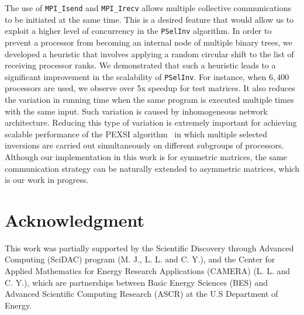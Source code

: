 \documentclass{acm_proc_article-sp}
\newcommand{\pselinv}{\texttt{PSelInv}\xspace}
\begin{document}
The use of \texttt{MPI\_Isend} and \texttt{MPI\_Irecv} 
allows multiple collective communications to be initiated
at the same time. This is a desired feature that would allow
us to exploit a higher level of concurrency in the \pselinv 
algorithm. In order to prevent a processor from becoming 
an internal node of multiple binary trees, we developed
a heuristic that involves applying a random circular shift to 
the list of receiving processor ranks. We demonstrated that such
a heuristic leads to a significant improvement in the scalability
of \pselinv. For instance, when $6,400$ processors are used, we observe
over 5x speedup for test matrices. It also reduces the variation in running time when
the same program is executed multiple times with the same input.
Such variation is caused by inhomogeneous network architecture.
Reducing this type of variation is extremely important for 
achieving scalable performance of the PEXSI
algorithm~\cite{LinLuYingCarE2009,LinYangLuEtAl2011,LinChenYangEtAl2013}
in which multiple selected inversions are carried out simultaneously on
different subgroups of processors. Although our implementation in this
work is for symmetric matrices, the same communication strategy can
be naturally extended to asymmetric matrices, which is our work in
progress.












\section*{Acknowledgment}
This work was partially supported by the Scientific Discovery through
Advanced Computing (SciDAC) program (M. J., L. L.  and C. Y.), and the
Center for Applied Mathematics for Energy Research Applications (CAMERA)
(L. L. and C. Y.), which are partnerships between Basic
Energy Sciences (BES) and Advanced Scientific Computing Research (ASCR)
at the U.S Department of Energy.



\end{document}
